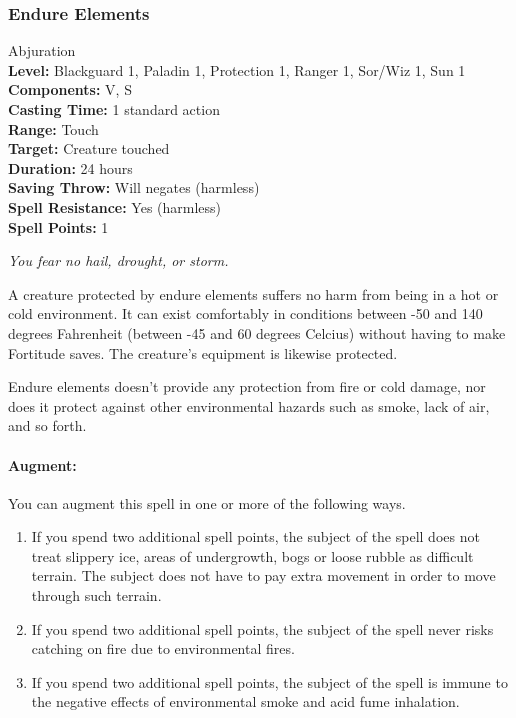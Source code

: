 \subsubsection{Endure Elements}
\label{Spell:EndureElements}
Abjuration
\\ \textbf{Level:} Blackguard 1, Paladin 1, Protection 1, Ranger 1, Sor/Wiz 1, Sun 1
\\ \textbf{Components:} V, S
\\ \textbf{Casting Time:} 1 standard action
\\ \textbf{Range:} Touch
\\ \textbf{Target:} Creature touched
\\ \textbf{Duration:} 24 hours
\\ \textbf{Saving Throw:} Will negates (harmless)
\\ \textbf{Spell Resistance:} Yes (harmless)
\\ \textbf{Spell Points:} 1

\emph{You fear no hail, drought, or storm.}

A creature protected by endure elements suffers no harm from being in a hot or cold environment. 
It can exist comfortably in conditions between -50 and 140 degrees Fahrenheit (between -45 and 60 degrees Celcius) without having to make Fortitude saves. 
The creature's equipment is likewise protected.

Endure elements doesn't provide any protection from fire or cold damage, 
nor does it protect against other environmental hazards such as smoke, lack of air, and so forth.

\paragraph{Augment:} You can augment this spell in one or more of the following ways.
\begin{enumerate}
\item If you spend two additional spell points, the subject of the spell does not treat slippery ice, areas of undergrowth, bogs or loose rubble as difficult terrain.
The subject does not have to pay extra movement in order to move through such terrain.
\item If you spend two additional spell points, the subject of the spell never risks catching on fire due to environmental fires.
\item If you spend two additional spell points, the subject of the spell is immune to the negative effects of environmental smoke and acid fume inhalation.
\end{enumerate}

